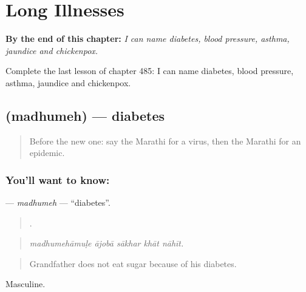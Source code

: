 
\chapter{Long Illnesses}
\label{ch:mr-long-illnesses}

\begin{chapteropening}
\textbf{By the end of this chapter:} \emph{I can name diabetes, blood pressure, asthma, jaundice and chickenpox.}

Complete the last lesson of chapter 485: I can name diabetes, blood pressure, asthma, jaundice and chickenpox.
\end{chapteropening}

\section[\texorpdfstring{\mr{मधुमेह} (madhumeh)}{मधुमेह (madhumeh)}]{ (madhumeh) — diabetes}

\label{lesson:MR-C485-madhumeh}



\begin{quote}
Before the new one: say the Marathi for a virus, then the Marathi for an epidemic.
\end{quote}

\subsection*{You'll want to know: }
\textbf{} — \emph{madhumeh} — \textquotedblleft{}diabetes\textquotedblright{}.

\begin{quote}
    .
\end{quote}

\begin{quote}
\emph{madhumehāmuḷe ājobā sākhar khāt nāhīt.}
\end{quote}

\begin{quote}
Grandfather does not eat sugar because of his diabetes.
\end{quote}

Masculine.

